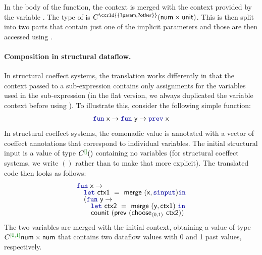 In the body of the function, the context  is merged with the context provided by the
variable . The type of  is $\ctyp{\ccrld{\{\ident{?param},\ident{?other}\}}}{(\ident{num}\times\ident{unit})}$.
This is then split into two parts that contain just one of the implicit parameters and those are
then accessed using .

\paragraph{Composition in structural dataflow.}

In structural coeffect systems, the translation works differently in that the context passed to
a sub-expression contains only assignments for the variables used in the sub-expression (in the
flat version, we always duplicated the variable context before using ). To illustrate
this, consider the following simple function:
%
\begin{equation*}
\begin{array}{l}
\kvd{fun}~\ident{x} \rightarrow \kvd{fun}~\ident{y} \rightarrow \kvd{prev}~\ident{x}
\end{array}
\end{equation*}
%
In structural coeffect systems, the comonadic value is annotated with a vector of coeffect
annotations that correspond to individual variables. The initial structural input 
is a value of type $\ctyp{\cclrd{[]}}{()}$ containing no variables (for structural coeffect systems,
we write $()$ rather than  to make that more explicit). The translated code then looks
as follows:
%
\begin{equation*}
\begin{array}{l}
\kvd{fun}~\ident{x} \rightarrow\\[-0.25em]
\quad \kvd{let}~\ident{ctx1} ~=~ \ident{merge}~(\ident{x}, \kvd{sinput}) \kvd{in}\\[-0.25em]
\quad (\kvd{fun}~\ident{y} \rightarrow\\[-0.25em]
\quad \quad \kvd{let}~\ident{ctx2} ~=~ \ident{merge}~(\ident{y}, \ident{ctx1})~\kvd{in}\\[-0.25em]
\quad \quad \ident{counit}~(\ident{prev}~(\ident{choose}_{\langle 0,1\rangle}~\ident{ctx2}))
\end{array}
\end{equation*}
%
The two variables are merged with the initial context, obtaining a value  of type
$\ctyp{\cclrd{[0, 1]}}{\ident{num}\times\ident{num}}$ that contains two dataflow values with 0 and 1 past
values, respectively.

